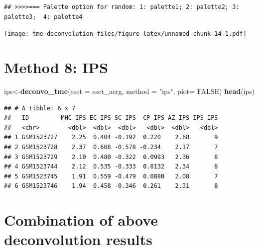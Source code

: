 \documentclass[
  12pt,
]{book}
\newenvironment{Shaded}{\begin{snugshade}}{\end{snugshade}}
\newcommand{\AttributeTok}[1]{\textcolor[rgb]{0.13,0.29,0.53}{#1}}
\newcommand{\ConstantTok}[1]{\textcolor[rgb]{0.56,0.35,0.01}{#1}}
\newcommand{\FunctionTok}[1]{\textcolor[rgb]{0.13,0.29,0.53}{\textbf{#1}}}
\newcommand{\NormalTok}[1]{#1}
\newcommand{\OtherTok}[1]{\textcolor[rgb]{0.56,0.35,0.01}{#1}}
\newcommand{\StringTok}[1]{\textcolor[rgb]{0.31,0.60,0.02}{#1}}
\begin{document}
\begin{verbatim}
## >>>>=== Palette option for random: 1: palette1; 2: palette2; 3: palette3;  4: palette4
\end{verbatim}

\texttt{[image: tme-deconvolution\_files/figure-latex/unnamed-chunk-14-1.pdf]}

\hypertarget{method-8-ips}{%
\section{Method 8: IPS}\label{method-8-ips}}

\begin{Shaded}
\begin{Highlighting}[]
\NormalTok{ips}\OtherTok{\textless{}{-}}\FunctionTok{deconvo\_tme}\NormalTok{(}\AttributeTok{eset =}\NormalTok{ eset\_acrg, }\AttributeTok{method =} \StringTok{"ips"}\NormalTok{, }\AttributeTok{plot=} \ConstantTok{FALSE}\NormalTok{)}
\FunctionTok{head}\NormalTok{(ips)}
\end{Highlighting}
\end{Shaded}

\begin{verbatim}
## # A tibble: 6 x 7
##   ID         MHC_IPS EC_IPS SC_IPS  CP_IPS AZ_IPS IPS_IPS
##   <chr>        <dbl>  <dbl>  <dbl>   <dbl>  <dbl>   <dbl>
## 1 GSM1523727    2.25  0.404 -0.192  0.220    2.68       9
## 2 GSM1523728    2.37  0.608 -0.578 -0.234    2.17       7
## 3 GSM1523729    2.10  0.480 -0.322  0.0993   2.36       8
## 4 GSM1523744    2.12  0.535 -0.333  0.0132   2.34       8
## 5 GSM1523745    1.91  0.559 -0.479  0.0880   2.08       7
## 6 GSM1523746    1.94  0.458 -0.346  0.261    2.31       8
\end{verbatim}

\hypertarget{combination-of-above-deconvolution-results}{%
\section{Combination of above deconvolution results}\label{combination-of-above-deconvolution-results}}
\end{document}
